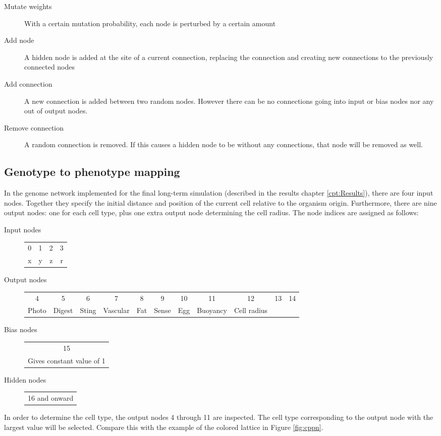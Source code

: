 \begin{description}
    \item[Mutate weights] With a certain mutation probability, each node is perturbed by a certain amount
    \item[Add node] A hidden node is added at the site of a current connection, replacing the connection and creating new connections to the previously connected nodes
    \item[Add connection] A new connection is added between two random nodes. However there can be no connections going into input or bias nodes nor any out of output nodes.
    \item[Remove connection] A random connection is removed. If this causes a hidden node to be without any connections, that node will be removed as well.
\end{description}

\subsection{Genotype to phenotype mapping}\label{subsec:genToPhenMapping}
In the genome network implemented for the final long-term simulation (described in the results chapter \ref{cpt:Results}), there are four input nodes. Together they specify the initial distance and position of the current cell relative to the organism origin. Furthermore, there are nine output nodes: one for each cell type, plus one extra output node determining the cell radius. The node indices are assigned as follows:
\begin{description}
\item[Input nodes]{\scriptsize
    \begin{tabular}{ | c | c | c | c |}
      0 & 1 & 2 & 3 \\
      x & y & z & r \\
    \end{tabular}}
\item[Output nodes]{\scriptsize
    \begin{tabular}{| c | c | c | c | c | c | c | c || c | c | c |}
     4 & 5 & 6 & 7 & 8 & 9 & 10 & 11 & 12 & 13 & 14 \\
    Photo & Digest & Sting & Vascular & Fat & Sense & Egg & Buoyancy & Cell radius & &  \\
    \end{tabular}}
\item[Bias nodes]{\scriptsize
    \begin{tabular}{| c |}
      15 \\
      Gives constant value of 1 \\
    \end{tabular}}
\item[Hidden nodes]{\scriptsize
    \begin{tabular}{| c |}
     16 and onward
    \end{tabular}}
\end{description}
In order to determine the cell type, the output nodes 4 through 11 are inspected. The cell type corresponding to the output node with the largest value will be selected. Compare this with the example of the colored lattice in Figure \ref{fig:cppn}.

